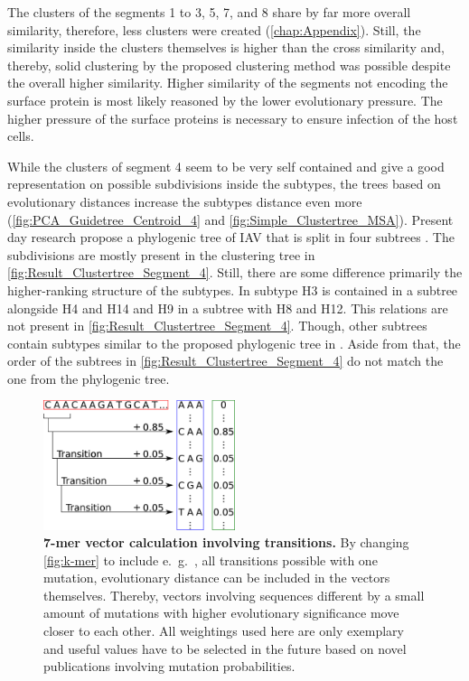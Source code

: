\vspace{1em}

The clusters of the segments 1 to 3, 5, 7, and 8 share by far more overall similarity, therefore, less clusters were created (\autoref{chap:Appendix}). Still, the similarity inside the clusters themselves is higher than the cross similarity and, thereby, solid clustering by the proposed clustering method was possible despite the overall higher similarity. Higher similarity of the segments not encoding the surface protein is most likely reasoned by the lower evolutionary pressure. The higher pressure of the surface proteins is necessary to ensure infection of the host cells. 

\vspace{1em}

While the clusters of segment 4 seem to be very self contained and give a good representation on possible subdivisions inside the subtypes, the trees based on evolutionary distances increase the subtypes distance even more (\autoref{fig:PCA_Guidetree_Centroid_4} and \autoref{fig:Simple_Clustertree_MSA}). Present day research propose a phylogenic tree of \gls{IAV} that is split in four subtrees \autocite{wei_next-generation_2020}. The subdivisions are mostly present in the clustering tree in \autoref{fig:Result_Clustertree_Segment_4}. Still, there are some difference primarily the higher-ranking structure of the subtypes. In \textcite{wei_next-generation_2020} subtype H3 is contained in a subtree alongside H4 and H14 and H9 in a subtree with H8 and H12. This relations are not present in \autoref{fig:Result_Clustertree_Segment_4}. Though, other subtrees contain subtypes similar to the proposed phylogenic tree in \textcite{wei_next-generation_2020}. Aside from that, the order of the subtrees in \autoref{fig:Result_Clustertree_Segment_4} do not match the one from the phylogenic tree.

\begin{figure}[!hbt]
    \centering
    \includegraphics[width=0.5\textwidth]{Graphics/Transition.pdf}
    \caption[7-mer vector calculation involving transitions]{\textbf{7-mer vector calculation involving transitions.} By changing \autoref{fig:k-mer} to include e.~g.~, all transitions possible with one mutation, evolutionary distance can be included in the vectors themselves. Thereby, vectors involving sequences different by a small amount of mutations with higher evolutionary significance move closer to each other. All weightings used here are only exemplary and useful values have to be selected in the future based on novel publications  involving mutation probabilities.}
    \label{fig:trans}
\end{figure}

